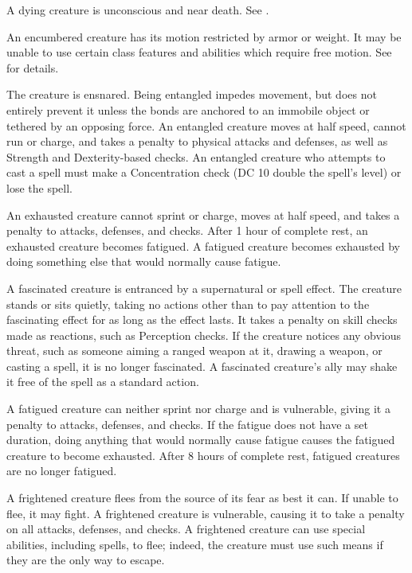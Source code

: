  A dying creature is unconscious and near death. See .

 An encumbered creature has its motion restricted by armor or weight. It may be unable to use certain class features and abilities which require free motion. See  for details.

 The creature is ensnared. Being entangled impedes movement, but does not entirely prevent it unless the bonds are anchored to an immobile object or tethered by an opposing force. An entangled creature moves at half speed, cannot run or charge, and takes a  penalty to physical attacks and defenses, as well as Strength and Dexterity-based checks. An entangled creature who attempts to cast a spell must make a Concentration check (DC 10 \add double the spell's level) or lose the spell.

 An exhausted creature cannot sprint or charge, moves at half speed, and takes a  penalty to attacks, defenses, and checks. After 1 hour of complete rest, an exhausted creature becomes fatigued. A fatigued creature becomes exhausted by doing something else that would normally cause fatigue.

 A fascinated creature is entranced by a supernatural or spell effect. The creature stands or sits quietly, taking no actions other than to pay attention to the fascinating effect for as long as the effect lasts. It takes a  penalty on skill checks made as reactions, such as Perception checks. If the creature notices any obvious threat, such as someone aiming a ranged weapon at it, drawing a weapon, or casting a spell, it is no longer fascinated. A fascinated creature's ally may shake it free of the spell as a standard action.

 A fatigued creature can neither sprint nor charge and is vulnerable, giving it a  penalty to attacks, defenses, and checks. If the fatigue does not have a set duration, doing anything that would normally cause fatigue causes the fatigued creature to become exhausted. After 8 hours of complete rest, fatigued creatures are no longer fatigued.

 A frightened creature flees from the source of its fear as best it can. If unable to flee, it may fight. A frightened creature is vulnerable, causing it to take a  penalty on all attacks, defenses, and checks. A frightened creature can use special abilities, including spells, to flee; indeed, the creature must use such means if they are the only way to escape.

